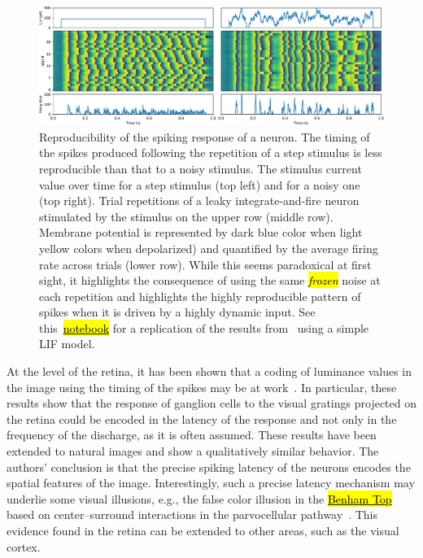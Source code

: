 \documentclass[brainsci, %
               review,accept,pdftex,moreauthors
               ]{Definitions/mdpi}
\begin{document}
\begin{figure}[H]
\includegraphics[width=\textwidth]{figures/replicating_MainenSejnowski1995.pdf} 
\caption{
  Reproducibility of the spiking response of a neuron. 
The timing of the spikes produced following the repetition of a step stimulus is less reproducible than that to a noisy stimulus. The stimulus current value over time for a step stimulus (top left) and for a noisy one (top right). Trial repetitions of a leaky integrate-and-fire neuron stimulated by the stimulus on the upper row (middle row). Membrane potential is represented by dark blue color when light yellow colors when depolarized) and quantified by the average firing rate across trials (lower row). While this seems paradoxical at first sight, it highlights the consequence of using the same \emph{\hl{frozen}} noise at each repetition and highlights the highly reproducible pattern of spikes when it is driven by a highly dynamic input. See this~\href{https://github.com/laurentperrinet/2022_UE-neurosciences-computationnelles/blob/master/C_MainenSejnowski1995_Perrinet.ipynb}{\hl{notebook}} %
for a replication of the results from~\citep{mainen_reliability_1995} using a simple LIF model.}\label{fig:mainen}
\end{figure}

 At the level of the retina, it has been shown that a coding of luminance values in the image using the timing of the spikes may be at work~\citep{gollisch_rapid_2008}. In particular, these results show that the response of ganglion cells to the visual gratings projected on the retina could be encoded in the latency of the response and not only in the frequency of the discharge, as it is often assumed. These results have been extended to natural images and show a qualitatively similar behavior. The authors' conclusion is that the precise spiking latency of the neurons encodes the spatial features of the image. Interestingly, such a precise latency mechanism may underlie some visual illusions, e.g., the false color illusion in the \href{https://michaelbach.de/ot/col-Benham/index.html}{\hl{Benham Top}} based on center--surround interactions in the parvocellular pathway~\citep{kenyon_theory_2004}. This evidence found in the retina can be extended to other areas, such as the visual cortex.
\end{document}
